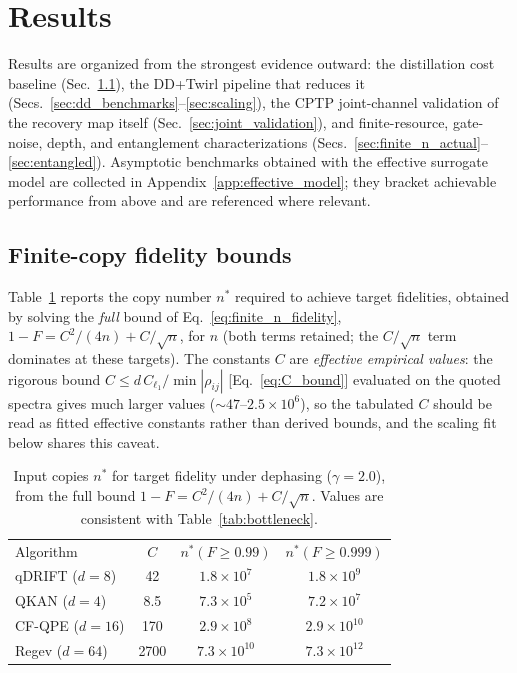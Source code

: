 \documentclass[pra,twocolumn,superscriptaddress,longbibliography,floatfix]{revtex4-2}
\begin{document}
\section{Results}
\label{sec:results}

Results are organized from the strongest evidence outward: the distillation cost baseline (Sec.~\ref{sec:finite_copy}), the DD+Twirl pipeline that reduces it (Secs.~\ref{sec:dd_benchmarks}--\ref{sec:scaling}), the CPTP joint-channel validation of the recovery map itself (Sec.~\ref{sec:joint_validation}), and finite-resource, gate-noise, depth, and entanglement characterizations (Secs.~\ref{sec:finite_n_actual}--\ref{sec:entangled}).
Asymptotic benchmarks obtained with the effective surrogate model are collected in Appendix~\ref{app:effective_model}; they bracket achievable performance from above and are referenced where relevant.

\subsection{Finite-copy fidelity bounds}
\label{sec:finite_copy}

Table~\ref{tab:finite_n} reports the copy number $n^*$ required to achieve target fidelities, obtained by solving the \emph{full} bound of Eq.~\eqref{eq:finite_n_fidelity}, $1 - F = C^2/(4n) + C/\sqrt{n}$, for $n$ (both terms retained; the $C/\sqrt{n}$ term dominates at these targets).
The constants $C$ are \emph{effective empirical values}: the rigorous bound $C \leq d\,C_{\ell_1}/\min|\rho_{ij}|$ [Eq.~\eqref{eq:C_bound}] evaluated on the quoted spectra gives much larger values ($\sim\!47$--$2.5 \times 10^6$), so the tabulated $C$ should be read as fitted effective constants rather than derived bounds, and the scaling fit below shares this caveat.

\begin{table}[!tbp]
\caption{Input copies $n^*$ for target fidelity under dephasing ($\gamma = 2.0$), from the full bound $1-F = C^2/(4n) + C/\sqrt{n}$. Values are consistent with Table~\ref{tab:bottleneck}.}
\label{tab:finite_n}
\centering\footnotesize
\setlength{\tabcolsep}{3pt}
\begin{ruledtabular}
\begin{tabular}{lccc}
Algorithm & $C$ & $n^*(F\!\geq\!0.99)$ & $n^*(F\!\geq\!0.999)$ \\
\colrule
qDRIFT ($d=8$) & 42 & $1.8 \times 10^7$ & $1.8 \times 10^9$ \\
QKAN ($d=4$) & 8.5 & $7.3 \times 10^5$ & $7.2 \times 10^7$ \\
CF-QPE ($d=16$) & 170 & $2.9 \times 10^8$ & $2.9 \times 10^{10}$ \\
Regev ($d=64$) & 2700 & $7.3 \times 10^{10}$ & $7.3 \times 10^{12}$ \\
\end{tabular}
\end{ruledtabular}
\end{table}
\end{document}
